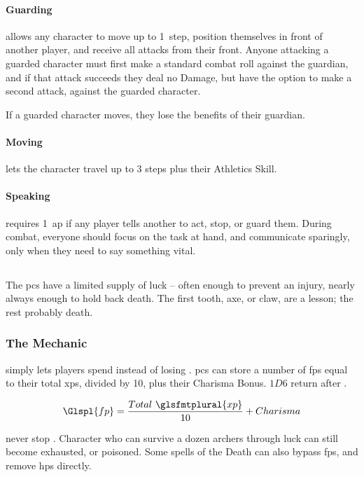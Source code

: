 \begin{multicols}{2}
\paragraph{Guarding}
\label{guarding}
allows any character to move up to 1~\gls{step}, position themselves in front of another player, and receive all attacks from their front.
Anyone attacking a guarded character must first make a standard combat roll against the guardian, and if that attack succeeds they deal no Damage, but have the option to make a second attack, against the guarded character.

If a guarded character moves, they lose the benefits of their guardian.

\paragraph{Moving}
\label{moving}
lets the character travel up to 3 steps plus their Athletics Skill.

\paragraph{Speaking}
requires 1~\gls{ap} if any player tells another to act, stop, or guard them.
During combat, everyone should focus on the task at hand, and communicate sparingly, only when they need to say something vital.

\subsection{}
\label{fate_points}

The \glspl{pc} have a limited supply of luck -- often enough to prevent an injury, nearly always enough to hold back death.
The first tooth, axe, or claw, are a lesson; the rest probably death.

\subsubsection{The Mechanic}
simply lets players spend  instead of losing .
\Glspl{pc} can store a number of \glspl{fp} equal to their total \glspl{xp}, divided by 10, plus their Charisma Bonus.
$1D6$ return after .%

\begin{center}
  $$\Glspl{fp} = \frac{Total~\glsfmtplural{xp}}{10} + Charisma$$
\end{center}

\noindent
{} never stop .
Character who can survive a dozen archers through luck can still become exhausted, or poisoned.
Some spells of the Death  can also bypass \glspl{fp}, and remove \glspl{hp} directly.


\end{multicols}
